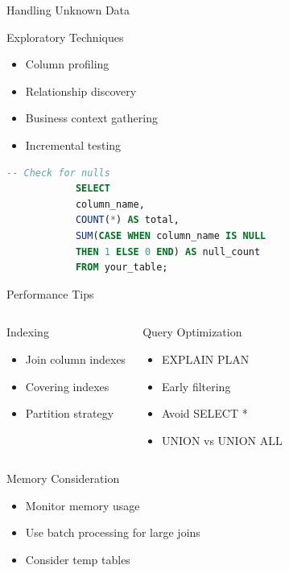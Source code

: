 \documentclass{beamer}
\begin{document}
	\begin{frame}[fragile]{Handling Unknown Data}
		\begin{block}{Exploratory Techniques}
			\begin{itemize}
				\item Column profiling
				\item Relationship discovery
				\item Business context gathering
				\item Incremental testing
			\end{itemize}
		\end{block}
		\begin{lstlisting}[language=SQL, caption=Defensive Querying]
			-- Check for nulls
			SELECT 
			column_name,
			COUNT(*) AS total,
			SUM(CASE WHEN column_name IS NULL 
			THEN 1 ELSE 0 END) AS null_count
			FROM your_table;
		\end{lstlisting}
	\end{frame}
	
	\begin{frame}{Performance Tips}
		\begin{columns}
			\begin{block}{Indexing}
				\begin{itemize}
					\item Join column indexes
					\item Covering indexes
					\item Partition strategy
				\end{itemize}
			\end{block}
			\begin{block}{Query Optimization}
				\begin{itemize}
					\item EXPLAIN PLAN
					\item Early filtering
					\item Avoid SELECT *
					\item UNION vs UNION ALL
				\end{itemize}
			\end{block}
		\end{columns}
		\vspace{0.5cm}
		\begin{alertblock}{Memory Consideration}
			\begin{itemize}
				\item Monitor memory usage
				\item Use batch processing for large joins
				\item Consider temp tables
			\end{itemize}
		\end{alertblock}
	\end{frame}
	
\end{document}
